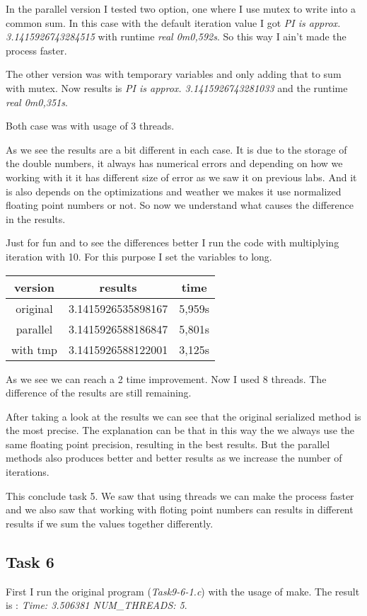 In the parallel version I tested two option, one where I use mutex to write into a common sum. In this case with the default iteration value I got \textit{PI is approx. 3.1415926743284515} with runtime \textit{real	0m0,592s}. So this way I ain't made the process faster. 

The other version was with temporary variables and only adding that to sum with mutex. Now results is \textit{PI is approx. 3.1415926743281033} and the runtime \textit{real 0m0,351s}.

Both case was with usage of 3 threads.


As we see the results are a bit different in each case. It is due to the storage of the double numbers, it always has numerical errors and depending on how we working with it it has different size of error as we saw it on previous labs. And it is also depends on the optimizations and weather we makes it use normalized floating point numbers or not. So now we understand what causes the difference in the results.


Just for fun and to see the differences better I run the code with multiplying iteration with 10. For this purpose I set the variables to long. 

\begin{tabular}{c|c|c}
version & results & time\\ \hline
original & 3.1415926535898167 & 5,959s\\
parallel & 3.1415926588186847 & 5,801s\\
with tmp & 3.1415926588122001 & 3,125s
\end{tabular}


As we see we can reach a 2 time improvement. Now I used 8 threads. The difference of the results are still remaining.

After taking a look at the results we can see that the original serialized method is the most precise. The explanation can be that in this way the we always use the same floating point precision, resulting in the best results.  But the parallel methods also produces better and better results as we increase the number of iterations.

This conclude task 5. We saw that using threads we can make the process faster and we also saw that working with floting point numbers can results in different results if we sum the values together differently.


\subsection*{Task 6}
First I run the original program (\textit{Task9-6-1.c}) with the usage of make. The result is : \textit{Time: 3.506381  NUM\_THREADS: 5}. 

